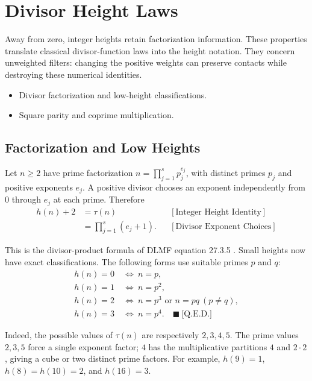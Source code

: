 \section{Divisor Height Laws}
Away from zero, integer heights retain factorization information. These
properties translate classical divisor-function laws \cite{dlmfdivisors} into the
height notation. They concern unweighted filters: changing the positive
weights can preserve contacts while destroying these numerical identities.

\begin{itemize}
\item Divisor factorization and low-height classifications.
\item Square parity and coprime multiplication.
\end{itemize}

\subsection{Factorization and Low Heights}

Let $n\ge2$ have prime factorization $n=\prod_{j=1}^{s}p_j^{e_j}$, with
distinct primes $p_j$ and positive exponents $e_j$. A positive divisor chooses
an exponent independently from $0$ through $e_j$ at each prime. Therefore
\begin{equation*}
\begin{aligned}
h(n)+2&=\tau(n)
&&[\text{Integer Height Identity}]\\
&=\prod_{j=1}^{s}(e_j+1).
&&[\text{Divisor Exponent Choices}]
\end{aligned}
\end{equation*}

This is the divisor-product formula of DLMF equation 27.3.5 \cite{dlmfdivisors}.
Small heights now have exact classifications. The following forms use suitable primes $p$ and $q$:
\begin{equation*}
\begin{aligned}
h(n)=0&\ \Longleftrightarrow\ n=p,\\
h(n)=1&\ \Longleftrightarrow\ n=p^2,\\
h(n)=2&\ \Longleftrightarrow\ n=p^3\text{ or }n=pq\ (p\ne q),\\
h(n)=3&\ \Longleftrightarrow\ n=p^4.
\quad\blacksquare\ \text{[Q.E.D.]}
\end{aligned}
\end{equation*}

Indeed, the possible values of $\tau(n)$ are respectively $2,3,4,5$.
The prime values $2,3,5$ force a single exponent factor; $4$ has the
multiplicative partitions $4$ and $2\cdot2$, giving a cube or two distinct
prime factors. For example, $h(9)=1$, $h(8)=h(10)=2$, and $h(16)=3$.

